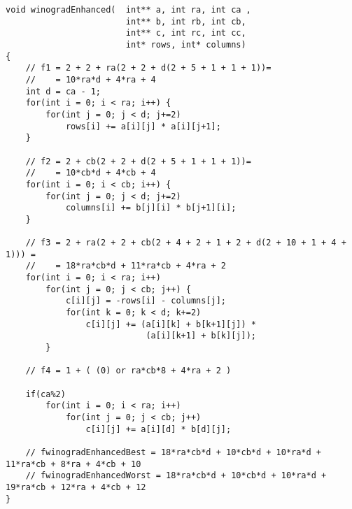 \begin{lstlisting}[style=CStyle, caption={Winograd enhanced algorithm},
                    label={list:winogradEnh}]
void winogradEnhanced(  int** a, int ra, int ca , 
                        int** b, int rb, int cb, 
                        int** c, int rc, int cc,
                        int* rows, int* columns)
{
    // f1 = 2 + 2 + ra(2 + 2 + d(2 + 5 + 1 + 1 + 1))=
    //    = 10*ra*d + 4*ra + 4
    int d = ca - 1;
    for(int i = 0; i < ra; i++) {
        for(int j = 0; j < d; j+=2)
            rows[i] += a[i][j] * a[i][j+1];
    }

    // f2 = 2 + cb(2 + 2 + d(2 + 5 + 1 + 1 + 1))=
    //    = 10*cb*d + 4*cb + 4
    for(int i = 0; i < cb; i++) {
        for(int j = 0; j < d; j+=2)
            columns[i] += b[j][i] * b[j+1][i];
    }

    // f3 = 2 + ra(2 + 2 + cb(2 + 4 + 2 + 1 + 2 + d(2 + 10 + 1 + 4 + 1))) =
    //    = 18*ra*cb*d + 11*ra*cb + 4*ra + 2
    for(int i = 0; i < ra; i++)
        for(int j = 0; j < cb; j++) {
            c[i][j] = -rows[i] - columns[j];
            for(int k = 0; k < d; k+=2)
                c[i][j] += (a[i][k] + b[k+1][j]) * 
                            (a[i][k+1] + b[k][j]);
        }

    // f4 = 1 + ( (0) or ra*cb*8 + 4*ra + 2 )

    if(ca%2)
        for(int i = 0; i < ra; i++)
            for(int j = 0; j < cb; j++)
                c[i][j] += a[i][d] * b[d][j];

    // fwinogradEnhancedBest = 18*ra*cb*d + 10*cb*d + 10*ra*d + 11*ra*cb + 8*ra + 4*cb + 10
    // fwinogradEnhancedWorst = 18*ra*cb*d + 10*cb*d + 10*ra*d + 19*ra*cb + 12*ra + 4*cb + 12
}
\end{lstlisting}
